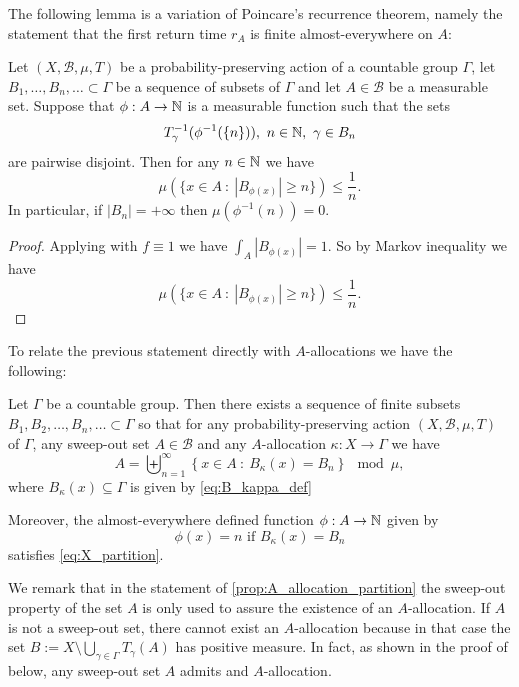 \documentclass[12pt,reqno]{amsart}
\begin{document}
The following lemma is a variation of Poincare's recurrence theorem, namely the statement that the first return time $r_A$ is finite almost-everywhere on $A$:
\begin{lemma}\label{lem:Kac_function_set_finite}
    Let  $(X,\mathcal{B},\mu,T)$ be a  probability-preserving action of a countable group $\Gamma$, let $B_1,\ldots,B_n,\ldots \subset \Gamma$ be a sequence of  subsets of $\Gamma$ and let $A \in \mathcal{B}$ be a measurable set.  
Suppose that $\phi:A \to \mathbb{N}$ is a measurable function such that the sets 
\[ T_\gamma^{-1}(\phi^{-1}(\{n\})),~ n \in \mathbb{N},~ \gamma \in B_n\]
are pairwise disjoint.
Then for any $n \in \mathbb{N}$ we have
\[\mu(\{ x \in A~:~ |B_{\phi(x)}| \ge n\}) \le \frac{1}{n}.\]
In particular, if $|B_n|=+\infty$ then $\mu(\phi^{-1}(n))= 0$.
\end{lemma}
\begin{proof}
    Applying  with  $f \equiv 1$ we have 
    $ \int_A |B_{\phi(x)}|=1$. 
So by Markov inequality we have
\[\mu(\{ x \in A~:~ |B_{\phi(x)}| \ge n\}) \le \frac{1}{n}.\]
\end{proof}



To relate the previous statement directly  with $A$-allocations we have the following:
\begin{lemma}\label{prop:A_allocation_partition}
    Let $\Gamma$ be a countable group. Then there exists a sequence of finite subsets $B_1,B_2,\ldots,B_n,\ldots \subset \Gamma$ so that for any
      probability-preserving action $(X,\mathcal{B},\mu,T)$ of $\Gamma$, any  sweep-out set $A \in \mathcal{B}$ and any  $A$-allocation $\kappa:X \to \Gamma$  we have
\begin{equation}\label{eq:A_partition_B_kappa}
A= \biguplus_{n=1}^\infty \left\{ x \in A~:~  B_\kappa(x) =  B_n \right\} \mod \mu, 
\end{equation}
where $B_{\kappa}(x) \subseteq \Gamma$ is given by \eqref{eq:B_kappa_def}

Moreover, the almost-everywhere defined function $\phi:A \to \mathbb{N}$ given by 
\begin{equation}\label{eq:phi_kappa_def}
\phi(x)=  n  \mbox{ if } B_\kappa(x) = B_n 
\end{equation}
satisfies \eqref{eq:X_partition}.
\end{lemma}
We remark that in the statement of \cref{prop:A_allocation_partition} the sweep-out property of the set $A$ is only used to assure the existence of an $A$-allocation. 
If $A$ is not a sweep-out set, there cannot exist an $A$-allocation because in that case the set $B:= X \setminus \bigcup_{\gamma \in \Gamma}T_{\gamma}(A)$ has positive measure.
In fact, as shown in the proof of  below, any sweep-out set $A$ admits and $A$-allocation.
\end{document}
